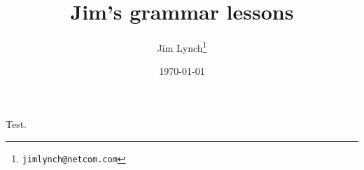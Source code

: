 \documentclass[a4paper]{memoir}
\begin{document}
\title{Jim's grammar lessons}
\author{Jim Lynch\thanks{\texttt{jimlynch@netcom.com}}}
\date{\today}
\maketitle



Test.
    
\end{document}
